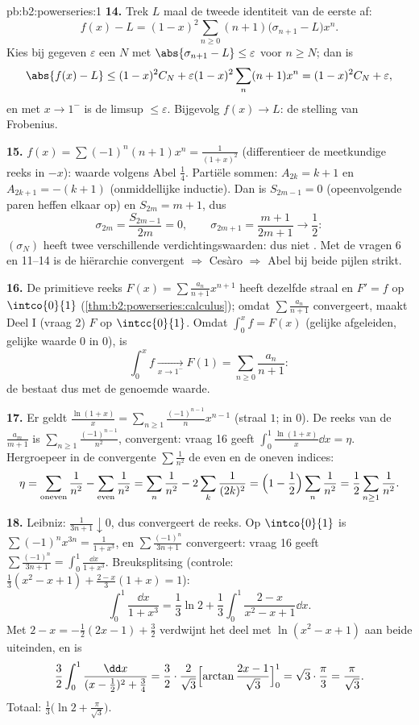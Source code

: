 \begin{solution}{pb:b2:powerseries:1}
\textbf{14.} Trek $L$ maal de tweede identiteit van de eerste af:
\[
f(x) - L = (1-x)^2\sum_{n\geq0}(n+1)
\bigl(\sigma_{n+1} - L\bigr)x^n .
\]
Kies bij gegeven $\varepsilon$ een $N$ met $\abs{\sigma_{n+1} - L}
\leq \varepsilon$ voor $n \geq N$; dan is
\[
\abs{f(x) - L} \leq (1-x)^2 C_N +
\varepsilon(1-x)^2\sum_{n}(n+1)x^n
= (1-x)^2C_N + \varepsilon ,
\]
en met $x \to 1^-$ is de limsup $\leq \varepsilon$. Bijgevolg $f(x)
\to L$: de stelling van Frobenius.

\textbf{15.} $f(x) = \sum(-1)^n(n+1)x^n = \frac{1}{(1+x)^2}$
(differentieer de meetkundige reeks in $-x$): waarde volgens Abel
$\frac14$. Partiële sommen: $A_{2k} = k+1$ en $A_{2k+1} = -(k+1)$
(onmiddellijke inductie). Dan is $S_{2m-1} = 0$ (opeenvolgende
paren heffen elkaar op) en $S_{2m} = m + 1$, dus
\[
\sigma_{2m} = \frac{S_{2m-1}}{2m} = 0,
\qquad
\sigma_{2m+1} = \frac{m+1}{2m+1} \to \frac12 :
\]
$(\sigma_N)$ heeft twee verschillende verdichtingswaarden: dus niet
. Met de vragen 6 en 11--14 is de hiërarchie
convergent $\Rightarrow$ Cesàro $\Rightarrow$ Abel bij beide pijlen
strikt.

\textbf{16.} De primitieve reeks $F(x) =
\sum\frac{a_n}{n+1}x^{n+1}$ heeft dezelfde straal en $F' = f$ op
$\intco{0}{1}$ (\cref{thm:b2:powerseries:calculus}); omdat
$\sum\frac{a_n}{n+1}$ convergeert, maakt Deel I (vraag 2) $F$
 op $\intcc{0}{1}$. Omdat $\int_0^x f = F(x)$ (gelijke
afgeleiden, gelijke waarde $0$ in $0$), is
\[
\int_0^x f \xrightarrow[x\to1^-]{} F(1)
= \sum_{n\geq0}\frac{a_n}{n+1} :
\]
de  bestaat dus met de genoemde waarde.

\textbf{17.} Er geldt $\frac{\ln(1+x)}{x} =
\sum_{n\geq1}\frac{(-1)^{n-1}}{n}x^{n-1}$ (straal $1$;  in
$0$). De reeks van de $\frac{a_m}{m+1}$ is
$\sum_{n\geq1}\frac{(-1)^{n-1}}{n^2}$,  convergent: vraag
16 geeft $\int_0^1\frac{\ln(1+x)}{x}\dd x = \eta$. Hergroepeer in
de  convergente $\sum\frac1{n^2}$ de even en de oneven
indices:
\[
\eta = \sum_{\text{oneven}}\frac1{n^2} -
\sum_{\text{even}}\frac1{n^2}
= \sum_{n}\frac1{n^2} - 2\sum_{k}\frac1{(2k)^2}
= \Bigl(1 - \frac12\Bigr)\sum_n\frac1{n^2}
= \frac12\sum_{n\geq1}\frac1{n^2} .
\]

\textbf{18.} Leibniz: $\frac{1}{3n+1}\downarrow0$, dus convergeert
de reeks. Op $\intco{0}{1}$ is $\sum(-1)^nx^{3n} =
\frac{1}{1+x^3}$, en $\sum\frac{(-1)^n}{3n+1}$ convergeert: vraag
16 geeft $\sum\frac{(-1)^n}{3n+1} = \int_0^1\frac{\dd x}{1+x^3}$.
Breuksplitsing (controle: $\frac13(x^2-x+1) + \frac{2-x}{3}(1+x) =
1$):
\[
\int_0^1\frac{\dd x}{1+x^3}
= \frac13\ln2 + \frac13\int_0^1\frac{2-x}{x^2-x+1}\dd x .
\]
Met $2 - x = -\frac12(2x-1) + \frac32$ verdwijnt het deel met
$\ln(x^2-x+1)$ aan beide uiteinden, en is
\[
\frac32\int_0^1\frac{\dd x}{(x-\frac12)^2 + \frac34}
= \frac32\cdot\frac{2}{\sqrt3}
\Bigl[\arctan\frac{2x-1}{\sqrt3}\Bigr]_0^1
= \sqrt3\cdot\frac{\pi}{3} = \frac{\pi}{\sqrt3} .
\]
Totaal: $\frac13\bigl(\ln2 + \frac{\pi}{\sqrt3}\bigr)$.


\end{solution}
